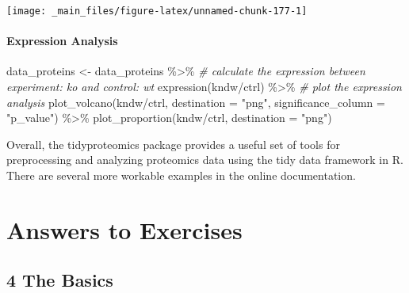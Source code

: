 \documentclass[
]{book}
\newenvironment{Shaded}{\begin{snugshade}}{\end{snugshade}}
\newcommand{\AttributeTok}[1]{\textcolor[rgb]{0.77,0.63,0.00}{#1}}
\newcommand{\CommentTok}[1]{\textcolor[rgb]{0.56,0.35,0.01}{\textit{#1}}}
\newcommand{\FunctionTok}[1]{\textcolor[rgb]{0.00,0.00,0.00}{#1}}
\newcommand{\NormalTok}[1]{#1}
\newcommand{\OtherTok}[1]{\textcolor[rgb]{0.56,0.35,0.01}{#1}}
\newcommand{\SpecialCharTok}[1]{\textcolor[rgb]{0.00,0.00,0.00}{#1}}
\newcommand{\StringTok}[1]{\textcolor[rgb]{0.31,0.60,0.02}{#1}}
\begin{document}
\begin{center}\texttt{[image: \_main\_files/figure-latex/unnamed-chunk-177-1]} \end{center}

\hypertarget{expression-analysis}{%
\subsubsection*{Expression Analysis}\label{expression-analysis}}

\begin{Shaded}
\begin{Highlighting}[]
\NormalTok{data\_proteins }\OtherTok{\textless{}{-}}\NormalTok{ data\_proteins }\SpecialCharTok{\%\textgreater{}\%}
  \CommentTok{\# calculate the expression between experiment: ko and control: wt}
  \FunctionTok{expression}\NormalTok{(kndw}\SpecialCharTok{/}\NormalTok{ctrl) }\SpecialCharTok{\%\textgreater{}\%}
  \CommentTok{\# plot the expression analysis}
  \FunctionTok{plot\_volcano}\NormalTok{(kndw}\SpecialCharTok{/}\NormalTok{ctrl, }\AttributeTok{destination =} \StringTok{"png"}\NormalTok{, }\AttributeTok{significance\_column =} \StringTok{"p\_value"}\NormalTok{) }\SpecialCharTok{\%\textgreater{}\%} 
  \FunctionTok{plot\_proportion}\NormalTok{(kndw}\SpecialCharTok{/}\NormalTok{ctrl, }\AttributeTok{destination =} \StringTok{"png"}\NormalTok{)}
\end{Highlighting}
\end{Shaded}

Overall, the tidyproteomics package provides a useful set of tools for preprocessing and analyzing proteomics data using the tidy data framework in R. There are several more workable examples in the online documentation.

\hypertarget{answers-to-exercises}{%
\chapter*{Answers to Exercises}\label{answers-to-exercises}}

\hypertarget{the-basics-1}{%
\section*{\texorpdfstring{\textbf{4} The Basics}{4 The Basics}}\label{the-basics-1}}
\end{document}
